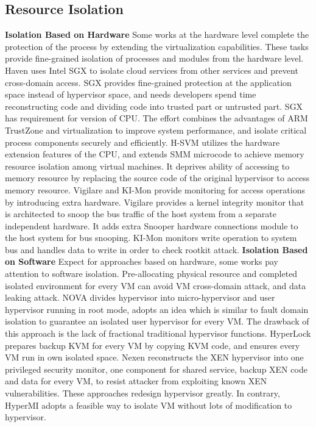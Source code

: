 \documentclass[conference]{IEEEtran}
\begin{document}
\subsection{Resource Isolation}
\textbf{Isolation Based on Hardware }
Some works at the hardware level complete the protection of the process by extending the virtualization capabilities. These tasks provide fine-grained isolation of processes and modules from the hardware level. Haven \cite{haven} uses Intel SGX\cite{Hoekstra13cuvillo,Mckeen2013Innovative} to isolate cloud services from other services and prevent cross-domain access. SGX provides fine-grained protection at the application space instead of hypervisor space, and needs developers spend time reconstructing code and dividing code into trusted part or untrusted part. SGX has requirement for version of CPU. The effort \cite{Cho2016Hardware} combines the advantages of ARM TrustZone and virtualization to improve system performance, and isolate critical process components securely and efficiently. H-SVM\cite{Jin2015H} utilizes the hardware extension features of the CPU, and extends SMM microcode to achieve memory resource isolation among virtual machines. It deprives ability of accessing to memory resource by replacing the source code of the original hypervisor to access memory resource. Vigilare\cite{Moon2012Vigilare} and KI-Mon \cite{Lee2013KI} provide monitoring for access operations by introducing extra hardware. Vigilare provides a kernel integrity monitor that is architected to snoop the bus traffic of the host system from a separate independent hardware. It adds extra Snooper hardware connections module to the host system for bus snooping. KI-Mon monitors write operation to system bus and handles data to write in order to check rootkit attack.
\textbf{Isolation Based on Software }
Expect for approaches based on hardware, some works\cite{nexen,Steinberg2010NOVA,hyperlock} pay attention to software isolation. Pre-allocating physical resource and completed isolated environment for every VM can avoid VM cross-domain attack, and data leaking attack. NOVA\cite{Steinberg2010NOVA} divides hypervisor into micro-hypervisor and user hypervisor running in root mode, adopts an idea which is similar to fault domain isolation to guarantee an isolated user hypervisor for every VM. The drawback of this approach is the lack of fractional traditional hypervisor functions. HyperLock \cite{hyperlock} prepares backup KVM for every VM by copying KVM code, and ensures every VM run in own isolated space. Nexen\cite{nexen} reconstructs the XEN hypervisor into one privileged security monitor, one component for shared service, backup XEN code and data for every VM, to resist attacker from exploiting known XEN vulnerabilities. These approaches redesign hypervisor greatly. In contrary, HyperMI adopts a feasible way to isolate VM without lots of modification to hypervisor. 
\end{document}
